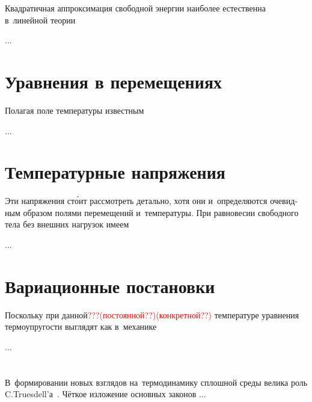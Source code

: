 \begin{otherlanguage}{russian}

Квадратичная аппроксимация свободной энергии наиболее естественна в~линейной теории

...



\section{Уравнения в перемещениях}

Полагая поле температуры известным

...



\section{Температурные напряжения}

Эти напряжения ст\'{о}ит рассмотреть детально, хотя они и~определяются очевидным образом полями перемещений и~температуры. При равновесии свободного тела без внешних нагрузок имеем

...



\section{Вариационные постановки}

Поскольку при данной\textcolor{red}{???(постоянной??)(конкретной??)} температуре уравнения термоупругости выглядят как в~механике

...




\vspace{8mm}
\hfill\begin{minipage}[b]{0.95\linewidth}
\fontsize{10}{12}\selectfont

\section*{\wordforbibliography}

В~формировании новых взглядов на~термодинамику сплошной среды велика роль C.\:Truesdell’а~\cite{truesdell-firstcourse}. Чёткое изложение основных законов ...

\end{minipage}

\end{otherlanguage}
